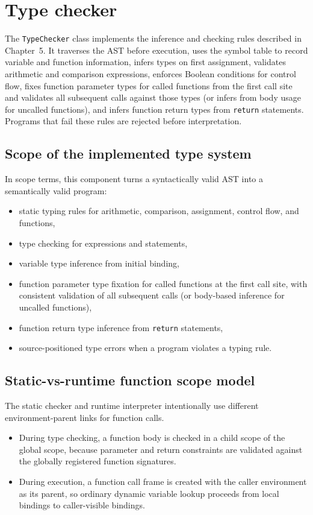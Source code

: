 \section{Type checker}
The \texttt{TypeChecker} class implements the inference and checking rules
described in Chapter~5. It traverses the AST before execution, uses the symbol
table to record variable and function information, infers types on first
assignment, validates arithmetic and comparison expressions, enforces Boolean
conditions for control flow, fixes function parameter types for called
functions from the first call site and validates all subsequent calls against
those types (or infers from body usage for uncalled functions), and infers
function return types from \texttt{return} statements. Programs that
fail these rules are rejected before interpretation.

\subsection{Scope of the implemented type system}
In scope terms, this component turns a syntactically valid AST into a
semantically valid program:

\begin{itemize}
	\item static typing rules for arithmetic, comparison, assignment, control
	flow, and functions,
	\item type checking for expressions and statements,
	\item variable type inference from initial binding,
	\item function parameter type fixation for called functions at the first call site, with consistent validation of all subsequent calls (or body-based inference for uncalled functions),
	\item function return type inference from \texttt{return} statements,
	\item source-positioned type errors when a program violates a typing rule.
\end{itemize}

\subsection{Static-vs-runtime function scope model}
The static checker and runtime interpreter intentionally use different
environment-parent links for function calls.

\begin{itemize}
  \item During type checking, a function body is checked in a child scope of
  the global scope, because parameter and return constraints are validated
  against the globally registered function signatures.
  \item During execution, a function call frame is created with the caller
  environment as its parent, so ordinary dynamic variable lookup proceeds from
  local bindings to caller-visible bindings.
\end{itemize}

